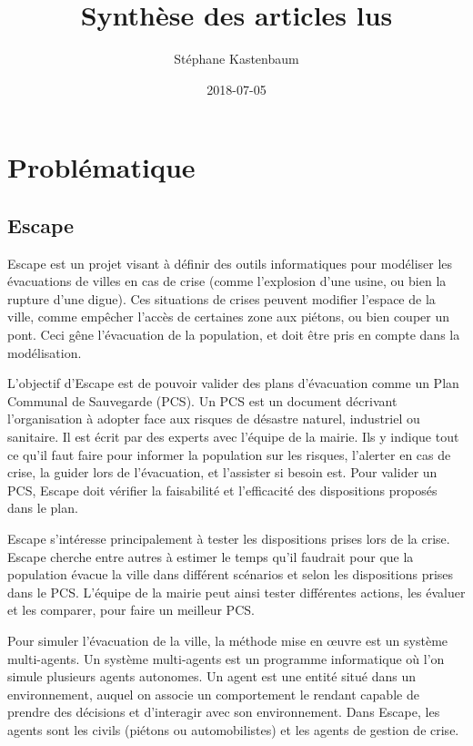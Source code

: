 \documentclass[a4paper]{article}
\title{Synthèse des articles lus}
\author{Stéphane Kastenbaum}
\date{2018-07-05}
\begin{document}
\maketitle

\section{Problématique}

\subsection{Escape}

Escape est un projet visant à définir des outils informatiques pour modéliser
les évacuations de villes en cas de crise (comme l'explosion d'une usine, ou
bien la rupture d'une digue). Ces situations de crises peuvent modifier l'espace
de la ville, comme empêcher l'accès de certaines zone aux piétons, ou bien
couper un pont. Ceci gêne l'évacuation de la population, et doit être pris en
compte dans la modélisation.

L'objectif d'Escape est de pouvoir valider des plans d'évacuation comme un Plan
Communal de Sauvegarde (PCS). Un PCS est un document décrivant l'organisation à
adopter face aux risques de désastre naturel, industriel ou sanitaire. Il est
écrit par des experts avec l'équipe de la mairie. Ils y indique tout ce qu'il
faut faire pour informer la population sur les risques, l'alerter en cas de
crise, la guider lors de l'évacuation, et l'assister si besoin est. Pour
valider un PCS, Escape doit vérifier la faisabilité et l'efficacité des
dispositions proposés dans le plan.

Escape s'intéresse principalement à tester les dispositions prises lors de la
crise. Escape cherche entre autres à estimer le temps qu'il faudrait pour que la
population évacue la ville dans différent scénarios et selon les dispositions
prises dans le PCS. L'équipe de la mairie peut ainsi tester différentes actions,
les évaluer et les comparer, pour faire un meilleur PCS.

Pour simuler l'évacuation de la ville, la méthode mise en œuvre est un système
multi-agents. Un système multi-agents est un programme informatique où l'on
simule plusieurs agents autonomes. Un agent est une entité situé dans un
environnement, auquel on associe un comportement le rendant capable de prendre
des décisions et d'interagir avec son environnement. Dans Escape, les agents
sont les civils (piétons ou automobilistes) et les agents de gestion de crise.
\end{document}
